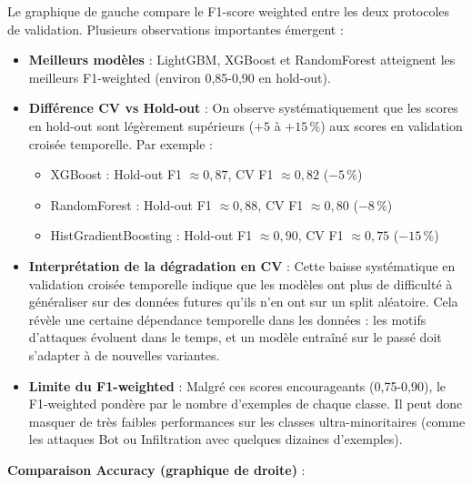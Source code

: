 ﻿\documentclass[11pt,a4paper]{article}
\begin{document}
Le graphique de gauche compare le F1-score weighted entre les deux protocoles de validation. Plusieurs observations importantes émergent :
\begin{itemize}
    \item \textbf{Meilleurs modèles} : LightGBM, XGBoost et RandomForest atteignent les meilleurs F1-weighted (environ 0,85-0,90 en hold-out).
    \item \textbf{Différence CV vs Hold-out} : On observe systématiquement que les scores en hold-out sont légèrement supérieurs ($+5$ à $+15$\,\%) aux scores en validation croisée temporelle. Par exemple :
    \begin{itemize}
        \item XGBoost : Hold-out F1 $\approx 0,87$, CV F1 $\approx 0,82$ ($-5$\,\%)
        \item RandomForest : Hold-out F1 $\approx 0,88$, CV F1 $\approx 0,80$ ($-8$\,\%)
        \item HistGradientBoosting : Hold-out F1 $\approx 0,90$, CV F1 $\approx 0,75$ ($-15$\,\%)
    \end{itemize}
    \item \textbf{Interprétation de la dégradation en CV} : Cette baisse systématique en validation croisée temporelle indique que les modèles ont plus de difficulté à généraliser sur des données futures qu'ils n'en ont sur un split aléatoire. Cela révèle une certaine dépendance temporelle dans les données : les motifs d'attaques évoluent dans le temps, et un modèle entraîné sur le passé doit s'adapter à de nouvelles variantes.
    \item \textbf{Limite du F1-weighted} : Malgré ces scores encourageants (0,75-0,90), le F1-weighted pondère par le nombre d'exemples de chaque classe. Il peut donc masquer de très faibles performances sur les classes ultra-minoritaires (comme les attaques Bot ou Infiltration avec quelques dizaines d'exemples).
\end{itemize}

\textbf{Comparaison Accuracy (graphique de droite)} :
\end{document}
